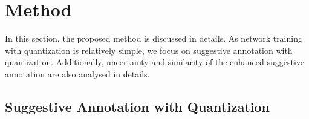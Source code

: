 \documentclass[10pt,twocolumn,letterpaper]{article}
\begin{document}







\section{Method}
In this section, the proposed method is discussed in details.
As network training with quantization is relatively simple, we focus on suggestive annotation with quantization.
Additionally, uncertainty and similarity of the enhanced suggestive annotation are also analysed in details.

\subsection{Suggestive Annotation with Quantization}
\end{document}
